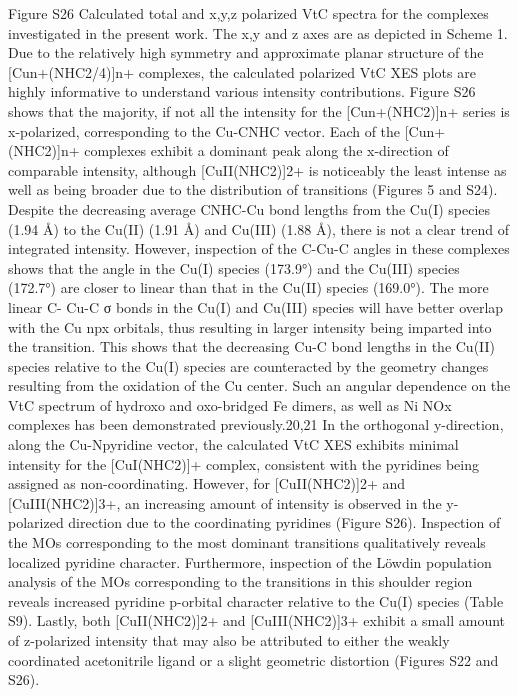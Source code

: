 Figure S26 Calculated total and x,y,z polarized VtC spectra for the complexes investigated in the present work. 
The x,y and z axes are as depicted in Scheme 1. 
Due to the relatively high symmetry and approximate planar structure of the [Cun+(NHC2/4)]n+ complexes, the 
calculated polarized VtC XES plots are highly informative to understand various intensity contributions. Figure 
S26 shows that the majority, if not all the intensity for the [Cun+(NHC2)]n+ series is x-polarized, corresponding to 
the Cu-CNHC vector. Each of the [Cun+(NHC2)]n+ complexes exhibit a dominant peak along the x-direction of 
comparable intensity, although [CuII(NHC2)]2+ is noticeably the least intense as well as being broader due to the 
distribution of transitions (Figures 5 and S24). Despite the decreasing average CNHC-Cu bond lengths from the 
Cu(I) species (1.94 Å) to the Cu(II) (1.91 Å) and Cu(III) (1.88 Å), there is not a clear trend of integrated intensity. 
However, inspection of the C-Cu-C angles in these complexes shows that the angle in the Cu(I) species (173.9°) 
and the Cu(III) species (172.7°) are closer to linear than that in the Cu(II) species (169.0°). The more linear C-
Cu-C σ bonds in the Cu(I) and Cu(III) species will have better overlap with the Cu npx orbitals, thus resulting in 
larger intensity being imparted into the transition. This shows that the decreasing Cu-C bond lengths in the Cu(II) 
species relative to the Cu(I) species are counteracted by the geometry changes resulting from the oxidation of 
the Cu center. Such an angular dependence on the VtC spectrum of hydroxo and oxo-bridged Fe dimers, as well 
as Ni NOx complexes has been demonstrated previously.20,21 
In the orthogonal y-direction, along the Cu-Npyridine vector, the calculated VtC XES exhibits minimal intensity for 
the [CuI(NHC2)]+ complex, consistent with the pyridines being assigned as non-coordinating. However, for 
[CuII(NHC2)]2+ and [CuIII(NHC2)]3+, an increasing amount of intensity is observed in the y-polarized direction due 
to the coordinating pyridines (Figure S26). Inspection of the MOs corresponding to the most dominant transitions 
qualitatively reveals localized pyridine character. Furthermore, inspection of the Löwdin population analysis of 
the MOs corresponding to the transitions in this shoulder region reveals increased pyridine p-orbital character 
relative to the Cu(I) species (Table S9). Lastly, both [CuII(NHC2)]2+ and [CuIII(NHC2)]3+ exhibit a small amount of 
z-polarized intensity that may also be attributed to either the weakly coordinated acetonitrile ligand or a slight 
geometric distortion (Figures S22 and S26). 


